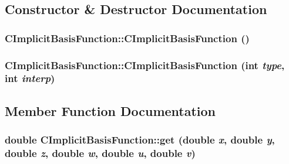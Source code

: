 \subsection{Constructor \& Destructor Documentation}
\hypertarget{classanl_1_1CImplicitBasisFunction_a9ccd8c95dfb0fd9cbe2b61ff763fa7d0}{
\subsubsection[{CImplicitBasisFunction}]{\setlength{\rightskip}{0pt plus 5cm}CImplicitBasisFunction::CImplicitBasisFunction ()}}
\label{classanl_1_1CImplicitBasisFunction_a9ccd8c95dfb0fd9cbe2b61ff763fa7d0}
\hypertarget{classanl_1_1CImplicitBasisFunction_af04b35601b62b2107e05ff4a7a1a58b6}{
\subsubsection[{CImplicitBasisFunction}]{\setlength{\rightskip}{0pt plus 5cm}CImplicitBasisFunction::CImplicitBasisFunction (int {\em type}, \/  int {\em interp})}}
\label{classanl_1_1CImplicitBasisFunction_af04b35601b62b2107e05ff4a7a1a58b6}


\subsection{Member Function Documentation}
\hypertarget{classanl_1_1CImplicitBasisFunction_a7841eca7a861e9bc6885b7a1c316c4df}{
\subsubsection[{get}]{\setlength{\rightskip}{0pt plus 5cm}double CImplicitBasisFunction::get (double {\em x}, \/  double {\em y}, \/  double {\em z}, \/  double {\em w}, \/  double {\em u}, \/  double {\em v})}}
\label{classanl_1_1CImplicitBasisFunction_a7841eca7a861e9bc6885b7a1c316c4df}


